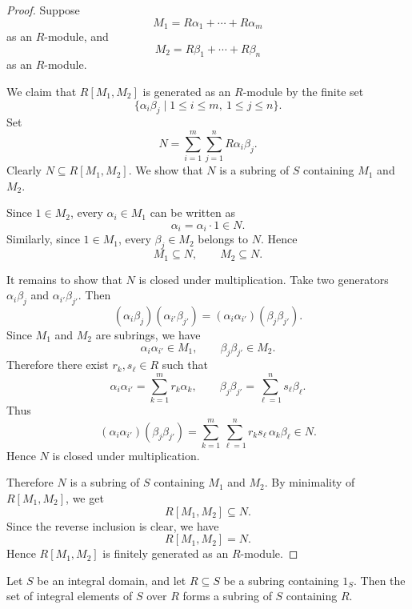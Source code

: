 \begin{proof}
    Suppose
    \[
        M_1=R\alpha_1+\cdots+R\alpha_m
    \]
    as an \(R\)-module, and
    \[
        M_2=R\beta_1+\cdots+R\beta_n
    \]
    as an \(R\)-module.

    We claim that \(R[M_1,M_2]\) is generated as an \(R\)-module by the finite set
    \[
        \{\alpha_i\beta_j\mid 1\le i\le m,\ 1\le j\le n\}.
    \]
    Set
    \[
        N=\sum_{i=1}^m\sum_{j=1}^n R\alpha_i\beta_j.
    \]
    Clearly \(N\subseteq R[M_1,M_2]\). We show that \(N\) is a subring of \(S\) containing
    \(M_1\) and \(M_2\).

    Since \(1\in M_2\), every \(\alpha_i\in M_1\) can be written as
    \[
        \alpha_i=\alpha_i\cdot 1\in N.
    \]
    Similarly, since \(1\in M_1\), every \(\beta_j\in M_2\) belongs to \(N\). Hence
    \[
        M_1\subseteq N,
        \qquad
        M_2\subseteq N.
    \]

    It remains to show that \(N\) is closed under multiplication. Take two generators
    \(\alpha_i\beta_j\) and \(\alpha_{i'}\beta_{j'}\). Then
    \[
        (\alpha_i\beta_j)(\alpha_{i'}\beta_{j'})
        =
        (\alpha_i\alpha_{i'})(\beta_j\beta_{j'}).
    \]
    Since \(M_1\) and \(M_2\) are subrings, we have
    \[
        \alpha_i\alpha_{i'}\in M_1,
        \qquad
        \beta_j\beta_{j'}\in M_2.
    \]
    Therefore there exist \(r_k,s_\ell\in R\) such that
    \[
        \alpha_i\alpha_{i'}
        =
        \sum_{k=1}^m r_k\alpha_k,
        \qquad
        \beta_j\beta_{j'}
        =
        \sum_{\ell=1}^n s_\ell\beta_\ell.
    \]
    Thus
    \[
        (\alpha_i\alpha_{i'})(\beta_j\beta_{j'})
        =
        \sum_{k=1}^m\sum_{\ell=1}^n r_ks_\ell\,\alpha_k\beta_\ell
        \in N.
    \]
    Hence \(N\) is closed under multiplication.

    Therefore \(N\) is a subring of \(S\) containing \(M_1\) and \(M_2\). By minimality of
    \(R[M_1,M_2]\), we get
    \[
        R[M_1,M_2]\subseteq N.
    \]
    Since the reverse inclusion is clear, we have
    \[
        R[M_1,M_2]=N.
    \]
    Hence \(R[M_1,M_2]\) is finitely generated as an \(R\)-module.
\end{proof}

\begin{theorem}
    Let \(S\) be an integral domain, and let \(R\subseteq S\) be a subring containing
    \(1_S\). Then the set of integral elements of \(S\) over \(R\) forms a subring of
    \(S\) containing \(R\).
\end{theorem}


